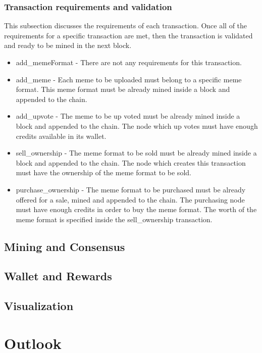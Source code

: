 \documentclass[12pt]{article}
\begin{document}
\subsubsection{Transaction requirements and validation}

This subsection discusses the requirements of each transaction. Once all of the requirements for a specific transaction are met, then the transaction is validated and ready to be mined in the next block.

\begin{itemize}
\item add\_memeFormat - There are not any requirements for this transaction.

\item add\_meme - Each meme to be uploaded must belong to a specific meme format. This meme format must be already mined inside a block and appended to the chain.

\item add\_upvote - The meme to be up voted must be already mined inside a block and appended to the chain. The node which up votes must have enough credits available in its wallet.

\item sell\_ownership - The meme format to be sold must be already mined inside a block and appended to the chain. The node which creates this transaction must have the ownership of the meme format to be sold.

\item purchase\_ownership - The meme format to be purchased must be already offered for a sale, mined and appended to the chain. The purchasing node must have enough credits in order to buy the meme format. The worth of the meme format is specified inside the sell\_ownership transaction.
\end{itemize}


\subsection{Mining and Consensus} %
\subsection{Wallet and Rewards} %
\subsection{Visualization} %


\section{Outlook} \label{sec:Outlook} %
\end{document}
